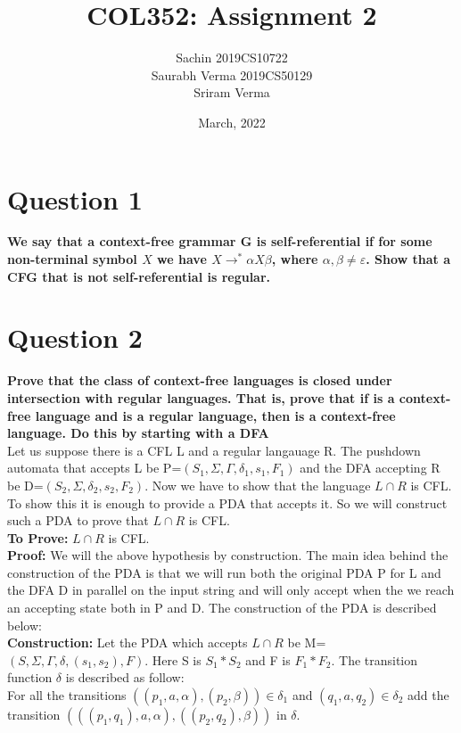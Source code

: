 \documentclass{article}
\title{COL352: Assignment 2}
\author{Sachin 2019CS10722 \\
        Saurabh Verma 2019CS50129\\
        Sriram Verma}
\date{March, 2022}
\begin{document}
\maketitle


\section{Question 1}
\textbf{We say that a context-free grammar G is self-referential if for some non-terminal symbol $X$ we have $X \to^* \alpha X \beta$, where $\alpha, \beta \neq \varepsilon$. Show that a CFG that is not self-referential is regular.}



\pagebreak


\section{Question 2}
\textbf{Prove that the class of context-free languages is closed under intersection with regular languages. That is, prove that if  is a context-free language and  is a regular language, then 
is a context-free language. Do this by starting with a DFA}\\
\newline
Let us suppose there is a CFL L and a regular langauage R. The pushdown automata that accepts L be P=$(S_1,\Sigma,\Gamma,\delta_1,s_1,F_1)$ and the DFA accepting R be D=$(S_2,\Sigma,\delta_2,s_2,F_2)$. Now we have to show that the language $L\cap R$ is CFL. To show this it is enough to provide a PDA that accepts it. So we will construct such a PDA to prove that  $L\cap R$ is CFL. \\
\textbf{To Prove:} $L\cap R$ is CFL. \\
\textbf{Proof:} We will the above hypothesis by construction. The main idea behind the construction of the PDA is that we will run both the original PDA P for L and the DFA D in parallel on the input string and will only accept when the we reach an accepting state both in P and D. The construction of the PDA is described below:\\
\textbf{Construction:} Let the PDA which accepts $L\cap R$ be M=$(S,\Sigma,\Gamma,\delta,(s_1,s_2),F)$. Here S is $S_1 * S_2$ and F is $F_1 *F_2$. The transition function $\delta$ is described as follow: \\
For all the transitions $((p_1,a,\alpha),(p_2,\beta)) \in \delta_1$  and $(q_1,a,q_2) \in \delta_2$ add the transition $(((p_1,q_1),a,\alpha),((p_2,q_2),\beta))$ in $\delta$.\\
\end{document}
